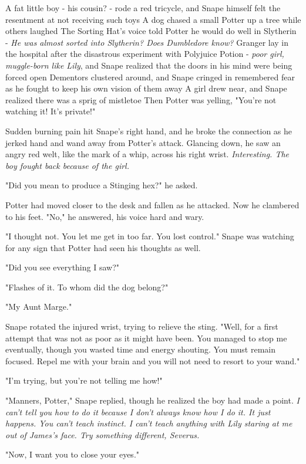 A fat little boy - his cousin? - rode a red tricycle, and Snape himself felt the resentment at not receiving such toys{\el} A dog chased a small Potter up a tree while others laughed{\el} The Sorting Hat's voice told Potter he would do well in Slytherin - \emph{He was almost sorted into Slytherin? Does Dumbledore know?}{\el} Granger lay in the hospital after the disastrous experiment with Polyjuice Potion - \emph{poor girl, muggle-born like Lily}, and Snape realized that the doors in his mind were being forced open{\el} Dementors clustered around, and Snape cringed in remembered fear as he fought to keep his own vision of them away{\el} A girl drew near, and Snape realized there was a sprig of mistletoe{\el} Then Potter was yelling, "You're not watching it! It's private!"

Sudden burning pain hit Snape's right hand, and he broke the connection as he jerked hand and wand away from Potter's attack. Glancing down, he saw an angry red welt, like the mark of a whip, across his right wrist. \emph{Interesting. The boy fought back because of the girl.}

"Did you mean to produce a Stinging hex?" he asked.

Potter had moved closer to the desk and fallen as he attacked. Now he clambered to his feet. "No," he answered, his voice hard and wary.

"I thought not. You let me get in too far. You lost control." Snape was watching for any sign that Potter had seen his thoughts as well.

"Did you see everything I saw?"

"Flashes of it. To whom did the dog belong?"

"My Aunt Marge."

Snape rotated the injured wrist, trying to relieve the sting. "Well, for a first attempt that was not as poor as it might have been. You managed to stop me eventually, though you wasted time and energy shouting. You must remain focused. Repel me with your brain and you will not need to resort to your wand."

"I'm trying, but you're not telling me how!"

"Manners, Potter," Snape replied, though he realized the boy had made a point. \emph{I can't tell you how to do it because I don't always know how I do it. It just happens. You can't teach instinct. I can't teach anything with Lily staring at me out of James's face. Try something different, Severus.}

"Now, I want you to close your eyes."


